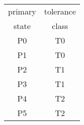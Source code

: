 \documentclass{article}
\begin{document}
\begin{tabular}{c c}
  primary & tolerance \\
  state & class \\
  \hline
  P0 & T0 \\
  P1 & T0 \\
  P2 & T1 \\
  P3 & T1 \\
  P4 & T2 \\
  P5 & T2
\end{tabular}
\end{document}
